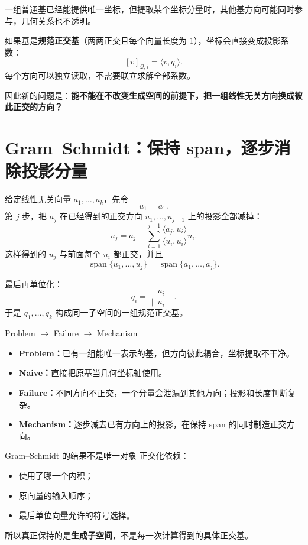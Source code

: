 \documentclass[11pt,a4paper]{ctexart}
\newcommand{\kw}[1]{\textbf{\color{deep}#1}}
\begin{document}
一组普通基已经能提供唯一坐标，但提取某个坐标分量时，其他基方向可能同时参与，几何关系也不透明。

如果基是\kw{规范正交基}（两两正交且每个向量长度为 $1$），坐标会直接变成投影系数：
\[
[v]_{\mathcal Q,i}=\langle v,q_i\rangle.
\]
每个方向可以独立读取，不需要联立求解全部系数。

因此新的问题是：\kw{能不能在不改变生成空间的前提下，把一组线性无关方向换成彼此正交的方向？}

\section{Gram--Schmidt：保持 span，逐步消除投影分量}

给定线性无关向量 $a_1,\dots,a_k$，先令
\[
u_1=a_1.
\]
第 $j$ 步，把 $a_j$ 在已经得到的正交方向 $u_1,\dots,u_{j-1}$ 上的投影全部减掉：
\[
\boxed{
u_j
=a_j-\sum_{i=1}^{j-1}
\frac{\langle a_j,u_i\rangle}{\langle u_i,u_i\rangle}u_i.}
\]
这样得到的 $u_j$ 与前面每个 $u_i$ 都正交，并且
\[
\operatorname{span}\{u_1,\dots,u_j\}
=\operatorname{span}\{a_1,\dots,a_j\}.
\]

最后再单位化：
\[
q_i=\frac{u_i}{\lVert u_i\rVert}.
\]
于是 $q_1,\dots,q_k$ 构成同一子空间的一组规范正交基。

\begin{corebox}{Problem $\to$ Failure $\to$ Mechanism}
\begin{itemize}
  \item \kw{Problem：}已有一组能唯一表示的基，但方向彼此耦合，坐标提取不干净。
  \item \kw{Naive：}直接把原基当几何坐标轴使用。
  \item \kw{Failure：}不同方向不正交，一个分量会泄漏到其他方向；投影和长度判断复杂。
  \item \kw{Mechanism：}逐步减去已有方向上的投影，在保持 span 的同时制造正交方向。
\end{itemize}
\end{corebox}

\begin{warnbox}{Gram--Schmidt 的结果不是唯一对象}
正交化依赖：
\begin{itemize}
  \item 使用了哪一个内积；
  \item 原向量的输入顺序；
  \item 最后单位向量允许的符号选择。
\end{itemize}
所以真正保持的是\kw{生成子空间}，不是每一次计算得到的具体正交基。
\end{warnbox}
\end{document}
